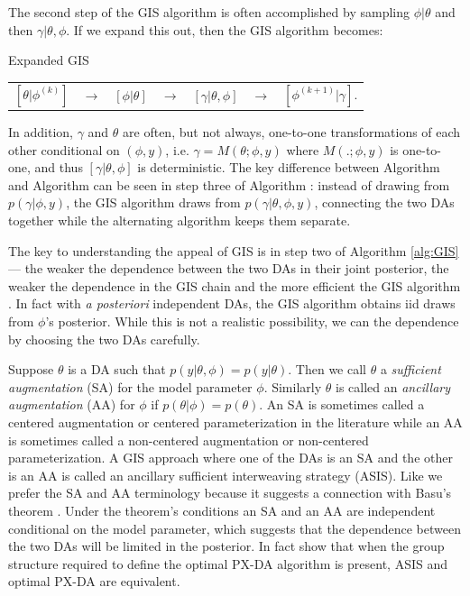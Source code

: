 \documentclass[12pt]{article}
\begin{document}
The second step of the GIS algorithm is often accomplished by sampling $\phi|\theta$ and then $\gamma|\theta,\phi$. If we expand this out, then the GIS algorithm becomes:
\begin{alg*}[eGIS]Expanded GIS\label{alg:eGIS}
{\small \vspace{-.5cm}
  \begin{center}
    \begin{tabular}{lllllll}
      $[\theta|\phi^{(k)}]$& $\to$& $[\phi|\theta]$& $\to $&$[\gamma|\theta,\phi]$& $\to$& $[\phi^{(k+1)}|\gamma]$.
    \end{tabular}
  \end{center}
}
\end{alg*}
\noindent
In addition, $\gamma$ and $\theta$ are often, but not always, one-to-one transformations of each other conditional on $(\phi,y)$, i.e. $\gamma = M(\theta;\phi,y)$ where $M(.;\phi,y)$ is one-to-one, and thus $[\gamma|\theta,\phi]$ is deterministic. The key difference between Algorithm  and Algorithm  can be seen in step three of Algorithm : instead of drawing from $p(\gamma|\phi,y)$, the GIS algorithm draws from $p(\gamma|\theta,\phi,y)$, connecting the two DAs together while the alternating algorithm keeps them separate.

The key to understanding the appeal of GIS is in step two of Algorithm \ref{alg:GIS} --- the weaker the dependence between the two DAs in their joint posterior, the weaker the dependence in the GIS chain and the more efficient the GIS algorithm \citep{yu2011center}. In fact with \emph{a posteriori} independent DAs, the GIS algorithm obtains iid draws from $\phi$'s posterior. While this is not a realistic possibility, we can the dependence by choosing the two DAs carefully. 

Suppose $\theta$ is a DA such that $p(y|\theta,\phi)=p(y|\theta)$. Then we call $\theta$ a {\it sufficient augmentation} (SA) for the model parameter $\phi$. Similarly $\theta$ is called an {\it ancillary augmentation} (AA) for $\phi$ if $p(\theta|\phi)=p(\theta)$. An SA is sometimes called a centered augmentation or centered parameterization in the literature while an AA is sometimes called a non-centered augmentation or non-centered parameterization. A GIS approach where one of the DAs is an SA and the other is an AA is called an ancillary sufficient interweaving strategy (ASIS). Like \citet{yu2011center} we prefer the SA and AA terminology because it suggests a connection with Basu's theorem \citep{basu1955statistics}. Under the theorem's conditions an SA and an AA are independent conditional on the model parameter, which suggests that the dependence between the two DAs will be limited in the posterior. In fact \citet{yu2011center} show that when the group structure required to define the optimal PX-DA algorithm \citep{liu1999parameter} is present, ASIS and optimal PX-DA are equivalent.
\end{document}
